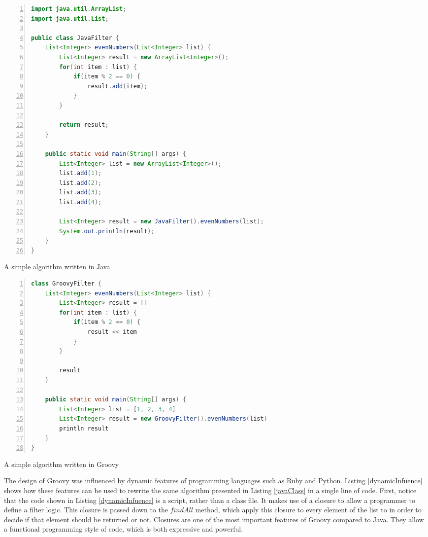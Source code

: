 \documentclass[preprint]{sigplanconf}
\begin{document}
\begin{Listing}[ht]
\begin{lstlisting}[language=Java,tabsize=2,breaklines=true,numbers=left]
import java.util.ArrayList;
import java.util.List;

public class JavaFilter {
	List<Integer> evenNumbers(List<Integer> list) {
		List<Integer> result = new ArrayList<Integer>();
		for(int item : list) {
			if(item % 2 == 0) {
				result.add(item);
			}
		}

		return result;
	}

	public static void main(String[] args) {
		List<Integer> list = new ArrayList<Integer>();
		list.add(1);
		list.add(2);
		list.add(3);
		list.add(4);

		List<Integer> result = new JavaFilter().evenNumbers(list);
		System.out.println(result);
	}
}
\end{lstlisting}
\caption{A simple algorithm written in Java}
\label{javaClass}
\end{Listing}

\begin{Listing}[ht]
\begin{lstlisting}[language=Java,tabsize=2,breaklines=true,numbers=left]
class GroovyFilter {
	List<Integer> evenNumbers(List<Integer> list) {
		List<Integer> result = []
		for(int item : list) {
			if(item % 2 == 0) {
				result << item
			}
		}

		result
	}

	public static void main(String[] args) {
		List<Integer> list = [1, 2, 3, 4]
		List<Integer> result = new GroovyFilter().evenNumbers(list)
		println result
	}
}
\end{lstlisting}
\caption{A simple algorithm written in Groovy}
\label{groovyClass}
\end{Listing}

The design of Groovy was influenced by dynamic features of programming languages such as Ruby and Python.
Listing \ref{dynamicInfuence} shows how these features can be used to rewrite the same algorithm presented in Listing \ref{javaClass} in a single line of code. 
First, notice that the code shown in Listing \ref{dynamicInfuence}  is a script, rather than a class file.
It makes use of a closure to allow a programmer to define a filter logic.
This closure is passed down to the $findAll$ method, which  apply this closure to every element of the list to in order to decide if that element should be returned or not.
Closures are one of the most important features of Groovy compared to Java.
They allow a functional programming style of code, which is both expressive and powerful.
\end{document}
